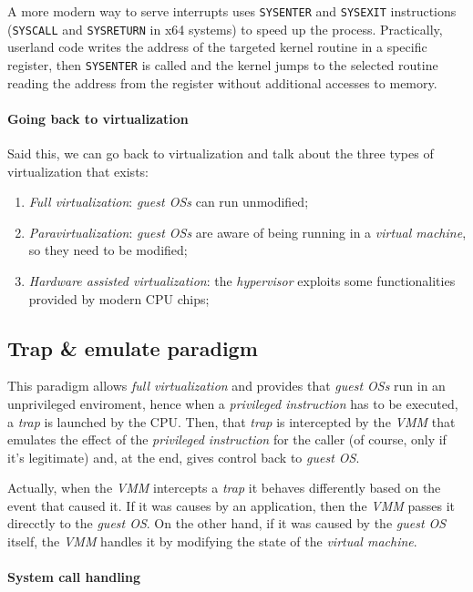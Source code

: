 A more modern way to serve interrupts uses \texttt{SYSENTER} and
\texttt{SYSEXIT} instructions (\texttt{SYSCALL} and \texttt{SYSRETURN} in
x64 systems) to speed up the process. Practically, userland code writes the
address of the targeted kernel routine in a specific register, then
\texttt{SYSENTER} is called and the kernel jumps to the selected routine
reading the address from the register without additional accesses to memory.

\paragraph{Going back to virtualization}
Said this, we can go back to virtualization and talk about the three types
of virtualization that exists:
\begin{enumerate}
    \item\emph{Full virtualization}: \emph{guest OSs} can run unmodified;
    \item\emph{Paravirtualization}: \emph{guest OSs} are aware of being running
    in a \emph{virtual machine}, so they need to be modified;
    \item\emph{Hardware assisted virtualization}: the \emph{hypervisor} exploits
    some functionalities provided by modern CPU chips;
\end{enumerate}

\subsection{Trap \& emulate paradigm}
This paradigm allows \emph{full virtualization} and provides that \emph{guest
OSs} run in an unprivileged enviroment, hence when a \emph{privileged
instruction} has to be executed, a \emph{trap} is launched by the CPU. Then,
that \emph{trap} is intercepted by the \emph{VMM} that emulates the effect of
the \emph{privileged instruction} for the caller (of course, only if it's
legitimate) and, at the end, gives control back to \emph{guest OS}.

Actually, when the \emph{VMM} intercepts a \emph{trap} it behaves differently
based on the event that caused it. If it was causes by an application, then the
\emph{VMM} passes it direcctly to the \emph{guest OS}. On the other hand, if it
was caused by the \emph{guest OS} itself, the \emph{VMM} handles it by
modifying the state of the \emph{virtual machine}.

\paragraph{System call handling}
\mbox{}

